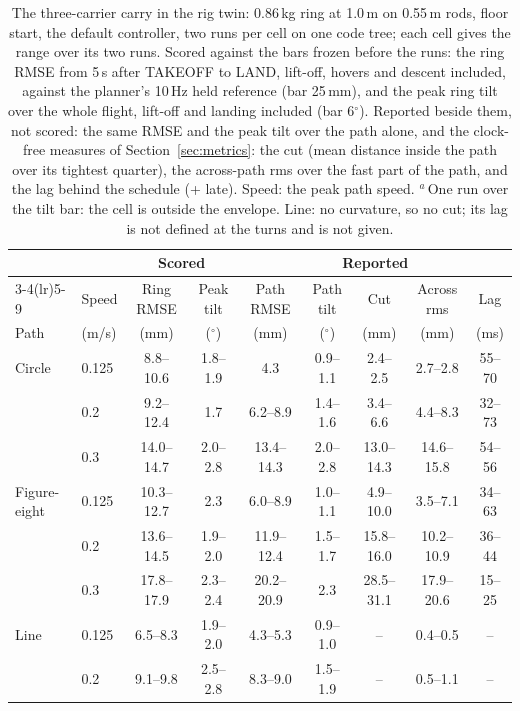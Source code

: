 \begin{table}[htbp]
\centering
\footnotesize
\setlength{\tabcolsep}{2.6pt}
\caption[The carry in the twin: the speed envelope]{The three-carrier carry in the rig twin: 0.86\,kg ring at
1.0\,m on 0.55\,m rods, floor start, the default controller, two runs per cell on one
code tree; each cell gives the range over its two runs. Scored against the bars frozen before the runs: the ring RMSE
from 5\,s after TAKEOFF to LAND, lift-off, hovers and descent included, against the planner's 10\,Hz held reference
(bar 25\,mm), and the peak ring tilt over the whole flight, lift-off and landing included (bar 6$^\circ$). Reported
beside them, not scored: the same RMSE and the peak tilt over the path alone, and the clock-free measures of
Section~\ref{sec:metrics}: the cut (mean distance inside the path over its tightest quarter), the across-path rms over
the fast part of the path, and the lag behind the schedule (+ late). Speed: the peak path speed. $^a$\,One run over the
tilt bar: the cell is outside the envelope. Line: no curvature, so no cut; its lag is not defined at the turns and is
not given.}
\label{tab:T7t}
\begin{tabular}{llccccccc}
\toprule
 & & \multicolumn{2}{c}{Scored} & \multicolumn{5}{c}{Reported} \\
\cmidrule(lr){3-4}\cmidrule(lr){5-9}
 & Speed & Ring RMSE & Peak tilt & Path RMSE & Path tilt & Cut & Across rms & Lag \\
Path & (m/s) & (mm) & ($^\circ$) & (mm) & ($^\circ$) & (mm) & (mm) & (ms) \\
\midrule
Circle & 0.125 & 8.8--10.6 & 1.8--1.9 & 4.3 & 0.9--1.1 & 2.4--2.5 & 2.7--2.8 & 55--70 \\
 & 0.2 & 9.2--12.4 & 1.7 & 6.2--8.9 & 1.4--1.6 & 3.4--6.6 & 4.4--8.3 & 32--73 \\
 & 0.3 & 14.0--14.7 & 2.0--2.8 & 13.4--14.3 & 2.0--2.8 & 13.0--14.3 & 14.6--15.8 & 54--56 \\
\addlinespace
Figure-eight & 0.125 & 10.3--12.7 & 2.3 & 6.0--8.9 & 1.0--1.1 & 4.9--10.0 & 3.5--7.1 & 34--63 \\
 & 0.2 & 13.6--14.5 & 1.9--2.0 & 11.9--12.4 & 1.5--1.7 & 15.8--16.0 & 10.2--10.9 & 36--44 \\
 & 0.3 & 17.8--17.9 & 2.3--2.4 & 20.2--20.9 & 2.3 & 28.5--31.1 & 17.9--20.6 & 15--25 \\
\addlinespace
Line & 0.125 & 6.5--8.3 & 1.9--2.0 & 4.3--5.3 & 0.9--1.0 & -- & 0.4--0.5 & -- \\
 & 0.2 & 9.1--9.8 & 2.5--2.8 & 8.3--9.0 & 1.5--1.9 & -- & 0.5--1.1 & -- \\

\end{tabular}
\end{table}
